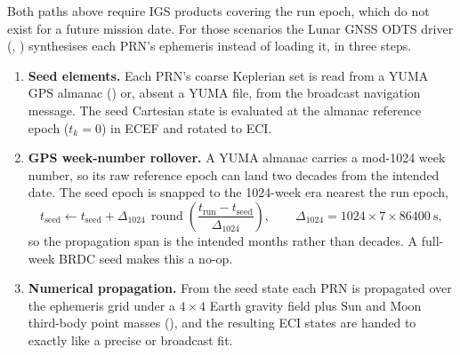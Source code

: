 Both paths above require IGS products covering the run epoch, which do not
exist for a future mission date. For those scenarios the Lunar GNSS ODTS
driver (,
)
synthesises each PRN's ephemeris instead of loading it, in three steps.

\begin{enumerate}[leftmargin=1.6em,itemsep=2pt]
  \item \textbf{Seed elements.} Each PRN's coarse Keplerian set is read from a
    YUMA GPS almanac () or, absent a YUMA
    file, from the broadcast navigation message. The seed Cartesian state is
    evaluated at the almanac reference epoch ($t_k = 0$) in ECEF and rotated
    to ECI.

  \item \textbf{GPS week-number rollover.} A YUMA almanac carries a mod-1024
    week number, so its raw reference epoch can land two decades from the
    intended date. The seed epoch is snapped to the 1024-week era nearest the
    run epoch,
    \begin{equation}
      \label{eq:gnss-rollover}
      t_{\mathrm{seed}} \leftarrow t_{\mathrm{seed}}
      + \Delta_{1024}\,
        \operatorname{round}\!\left(
          \frac{t_{\mathrm{run}} - t_{\mathrm{seed}}}{\Delta_{1024}}
        \right),
      \qquad
      \Delta_{1024} = 1024 \times 7 \times \SI{86400}{\second},
    \end{equation}
    so the propagation span is the intended months rather than decades. A
    full-week BRDC seed makes this a no-op.

  \item \textbf{Numerical propagation.} From the seed state each PRN is
    propagated over the ephemeris grid under a $4\times4$ Earth gravity field
    plus Sun and Moon third-body point masses
    (), and the resulting ECI states are handed to
     exactly like a precise or
    broadcast fit.
\end{enumerate}


